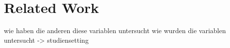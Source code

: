 \section{Related Work}
wie haben die anderen diese variablen untersucht
wie wurden die variablen untersucht -> studiensetting